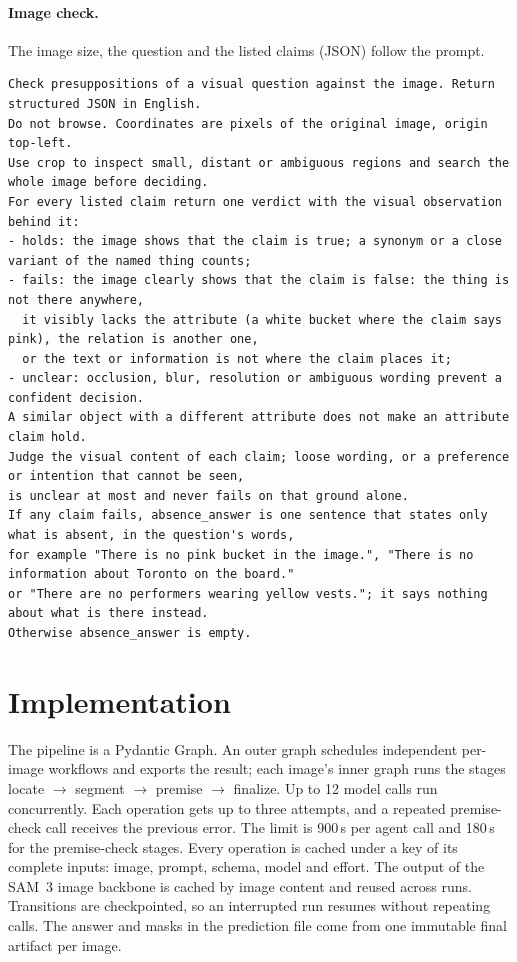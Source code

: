 \documentclass{article}
\begin{document}
\paragraph{Image check.}
The image size, the question and the listed claims (JSON) follow the prompt.
\begin{lstlisting}
Check presuppositions of a visual question against the image. Return structured JSON in English.
Do not browse. Coordinates are pixels of the original image, origin top-left.
Use crop to inspect small, distant or ambiguous regions and search the whole image before deciding.
For every listed claim return one verdict with the visual observation behind it:
- holds: the image shows that the claim is true; a synonym or a close variant of the named thing counts;
- fails: the image clearly shows that the claim is false: the thing is not there anywhere,
  it visibly lacks the attribute (a white bucket where the claim says pink), the relation is another one,
  or the text or information is not where the claim places it;
- unclear: occlusion, blur, resolution or ambiguous wording prevent a confident decision.
A similar object with a different attribute does not make an attribute claim hold.
Judge the visual content of each claim; loose wording, or a preference or intention that cannot be seen,
is unclear at most and never fails on that ground alone.
If any claim fails, absence_answer is one sentence that states only what is absent, in the question's words,
for example "There is no pink bucket in the image.", "There is no information about Toronto on the board."
or "There are no performers wearing yellow vests."; it says nothing about what is there instead.
Otherwise absence_answer is empty.
\end{lstlisting}

\section{Implementation}
\label{app:implementation}

The pipeline is a Pydantic Graph.
An outer graph schedules independent per-image workflows and exports the result;
each image's inner graph runs the stages locate $\rightarrow$ segment $\rightarrow$ premise $\rightarrow$ finalize.
Up to 12 model calls run concurrently.
Each operation gets up to three attempts, and a repeated premise-check call receives the previous error.
The limit is 900\,s per agent call and 180\,s for the premise-check stages.
Every operation is cached under a key of its complete inputs: image, prompt, schema, model and effort.
The output of the SAM~3 image backbone is cached by image content and reused across runs.
Transitions are checkpointed, so an interrupted run resumes without repeating calls.
The answer and masks in the prediction file come from one immutable final artifact per image.
\end{document}
